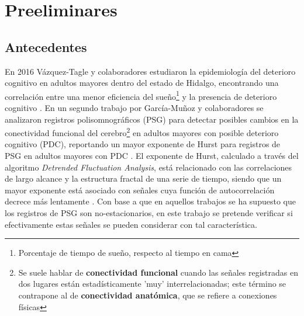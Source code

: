 
\chapter{Preeliminares}

\section{Antecedentes}

En 2016 V\'azquez-Tagle y colaboradores estudiaron la epidemiolog\'ia del 
deterioro cognitivo en adultos mayores dentro del estado de Hidalgo,
encontrando una correlaci\'on entre una menor eficiencia del sue\~no\footnote{Porcentaje de tiempo
de sue\~no, respecto al tiempo en cama} y la presencia de deterioro cognitivo \cite{VazquezTagle16}.
En un segundo trabajo por Garc\'ia-Mu\~noz y colaboradores \cite{Valeria} se analizaron 
registros polisomnogr\'aficos (PSG)
para detectar posibles cambios en la conectividad funcional del cerebro\footnote{Se suele 
hablar de \textbf{conectividad funcional} cuando las se\~nales registradas en dos lugares est\'an 
estad\'isticamente 'muy' interrelacionadas; este t\'ermino se contrapone al de \textbf{conectividad 
anat\'omica}, que se refiere a conexiones f\'isicas} en adultos mayores con posible deterioro 
cognitivo (PDC), reportando un mayor exponente de Hurst para registros de PSG en adultos mayores 
con PDC \cite{Valeria}.
El exponente de Hurst, calculado a trav\'es del algoritmo \textit{Detrended Fluctuation Analysis}, 
est\'a relacionado con las correlaciones de largo alcance y la estructura fractal de una serie de 
tiempo, siendo que un mayor exponente est\'a asociado con se\~nales cuya funci\'on de 
autocorrelaci\'on decrece m\'as lentamente \cite{Rodriguez11}.
Con base a que en aquellos trabajos se ha supuesto que los registros de PSG son no-estacionarios, 
en este trabajo se pretende verificar si efectivamente estas se\~nales se pueden considerar con tal
caracter\'istica.


